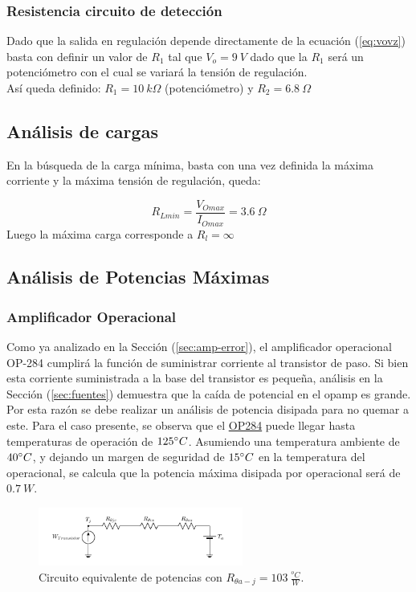 \subsubsection{Resistencia circuito de detección}
\label{sec:resdet}
Dado que la salida en regulación depende directamente de la ecuación (\ref{eq:vovz}) basta con definir un valor de $R_1$ tal que $V_o=9 \ V$ dado que la $R_1$ será un potenciómetro con el cual se variará la tensión de regulación.\\ Así queda definido: $R_1= 10 \ k\Omega$ (potenciómetro) y $R_2=6.8  \  \Omega$
\subsection{Análisis de cargas}
En la búsqueda de la carga mínima, basta con una vez definida la máxima corriente y la máxima tensión de regulación, queda:

\begin{equation}
	R_{Lmin} = \frac{V_{Omax}}{I_{Omax}} = 3.6 \ \Omega
\end{equation}
Luego la máxima carga corresponde a $R_l = \infty$
\subsection{Análisis de Potencias Máximas}

\subsubsection{Amplificador Operacional}
\label{sec:opamppot}

Como ya analizado en la Sección (\ref{sec:amp-error}), el amplificador operacional OP-284 cumplirá la función de suministrar corriente al transistor de paso. Si bien esta corriente suministrada a la base del transistor es pequeña, análisis en la Sección (\ref{sec:fuentes}) demuestra que la caída de potencial en el opamp es grande. Por esta razón se debe realizar un análisis de potencia disipada para no quemar a este. Para el caso presente, se observa que el \href{https://www.alldatasheet.com/datasheet-pdf/pdf/49039/AD/OP284.html}{OP284} puede llegar hasta temperaturas de operación de $125 \degree C$. Asumiendo una temperatura ambiente de $40 \degree C$, y dejando un margen de seguridad de $15\degree C$ en la temperatura del operacional, se calcula que la potencia máxima disipada por operacional será de $0.7 \ W$.
\begin{figure}[H]
\centering
	\includegraphics[width=0.6\textwidth, page=2]{ImagenesEjercicio2/Potencia.pdf}
	\caption{Circuito equivalente de potencias con $R_{\theta a-j} = 103 \ \frac{^o C}{W}$.}
	\label{fig:circuitopot}
\end{figure}

